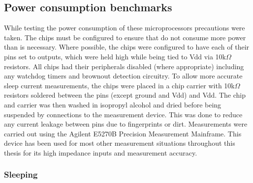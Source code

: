 


  \subsection{Power consumption benchmarks}

    While testing the power consumption of these microprocessors precautions were taken.
    The chips must be configured to ensure that do not consume more power than is necessary.
    Where possible, the chips were configured to have each of their pins set to outputs, which were held high while being tied to Vdd via 10k$\Omega$ resistors.
    All chips had their peripherals disabled (where appropriate) including any watchdog timers and brownout detection circuitry.
    To allow more accurate sleep current measurements, the chips were placed in a chip carrier with 10k$\Omega$ resistors soldered between the pins (except ground and Vdd) and Vdd.
    The chip and carrier was then washed in isopropyl alcohol and dried before being suspended by connections to the measurement device.
    This was done to reduce any current leakage between pins due to fingerprints or dirt.
    Measurements were carried out using the Agilent E5270B Precision Measurement Mainframe.
    This device has been used for most other measurement situations throughout this thesis for its high impedance inputs and measurement accuracy.


    \subsubsection*{Sleeping}


